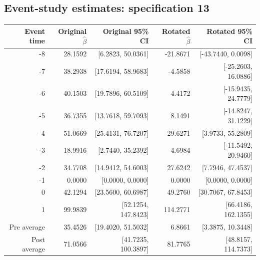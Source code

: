 \documentclass[10pt]{article}
\begin{document}
\subsection*{Event-study estimates: specification 13}
\begin{center}\scriptsize
\begin{tabular}{r rr rr}
\toprule
Event time & Original $\hat\beta$ & Original 95\% CI & Rotated $\hat\beta$ & Rotated 95\% CI \\
\midrule
-8 & 28.1592 & [6.2823, 50.0361] & -21.8671 & [-43.7440, 0.0098] \\
-7 & 38.2938 & [17.6194, 58.9683] & -4.5858 & [-25.2603, 16.0886] \\
-6 & 40.1503 & [19.7896, 60.5109] & 4.4172 & [-15.9435, 24.7779] \\
-5 & 36.7355 & [13.7618, 59.7093] & 8.1491 & [-14.8247, 31.1229] \\
-4 & 51.0669 & [25.4131, 76.7207] & 29.6271 & [3.9733, 55.2809] \\
-3 & 18.9916 & [2.7440, 35.2392] & 4.6984 & [-11.5492, 20.9460] \\
-2 & 34.7708 & [14.9412, 54.6003] & 27.6242 & [7.7946, 47.4537] \\
-1 & 0.0000 & [0.0000, 0.0000] & 0.0000 & [0.0000, 0.0000] \\
0 & 42.1294 & [23.5600, 60.6987] & 49.2760 & [30.7067, 67.8453] \\
1 & 99.9839 & [52.1254, 147.8423] & 114.2771 & [66.4186, 162.1355] \\
\midrule
Pre average & 35.4526 & [19.4020, 51.5032] & 6.8661 & [3.3875, 10.3448] \\
Post average & 71.0566 & [41.7235, 100.3897] & 81.7765 & [48.8157, 114.7373] \\
\bottomrule
\end{tabular}
\end{center}
\clearpage
\end{document}
